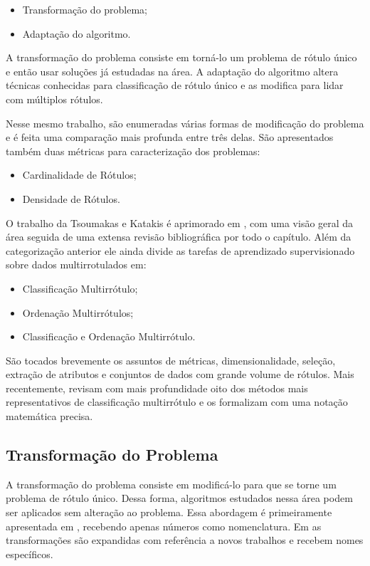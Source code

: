 \documentclass[runningheads,a4paper]{llncs}
\begin{document}
\begin{itemize}
\item Transformação do problema;
\item Adaptação do algoritmo.
\end{itemize}

A transformação do problema consiste em torná-lo um problema de rótulo único e então usar soluções já estudadas na área. A adaptação do algoritmo altera técnicas conhecidas para classificação de rótulo único e as modifica para lidar com múltiplos rótulos.

Nesse mesmo trabalho, são enumeradas várias formas de modificação do problema e é feita uma comparação mais profunda entre três delas. São apresentados também duas métricas para caracterização dos problemas:

\begin{itemize}
	\item Cardinalidade de Rótulos;
	\item Densidade de Rótulos.
\end{itemize}

O trabalho da Tsoumakas e Katakis é aprimorado em \cite{Tsoumakas2009-vw}, com uma visão geral da área seguida de uma extensa revisão bibliográfica por todo o capítulo. Além da categorização anterior ele ainda divide as tarefas de aprendizado supervisionado sobre dados multirrotulados em:

\begin{itemize}
	\item Classificação Multirrótulo;
	\item Ordenação Multirrótulos;
	\item Classificação e Ordenação Multirrótulo.
\end{itemize}

São tocados brevemente os assuntos de métricas, dimensionalidade, seleção, extração de atributos e conjuntos de dados com grande volume de rótulos. 
Mais recentemente, \cite{Zhang2014-be} revisam com mais profundidade oito dos métodos mais representativos de classificação multirrótulo e os formalizam com uma notação matemática precisa.

\subsection{Transformação do Problema}\label{subsec:transformacao}

A transformação do problema consiste em modificá-lo para que se torne um problema de rótulo único. Dessa forma, algoritmos estudados nessa área podem ser aplicados sem alteração ao problema. Essa abordagem é primeiramente apresentada em \cite{Tsoumakas2007-cw}, recebendo apenas números como nomenclatura. Em \cite{Tsoumakas2009-vw} as transformações são expandidas com referência a novos trabalhos e recebem nomes específicos.
\end{document}
